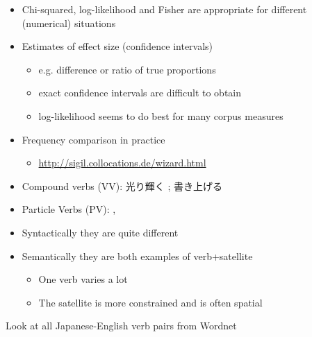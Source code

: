 \documentclass[a4paper,landscape,headrule,footrule,xetex]{foils}
\begin{document}
\begin{itemize}
\item Chi-squared, log-likelihood and Fisher are
appropriate for different (numerical) situations

\item Estimates of effect size (confidence intervals)
\begin{itemize}
\item e.g. difference or ratio of true proportions
\item exact confidence intervals are difficult to obtain
\item log-likelihood seems to do best for many corpus measures
\end{itemize}
\item Frequency comparison in practice
\begin{itemize}
\item \url{http://sigil.collocations.de/wizard.html}
\end{itemize}
\end{itemize}

\begin{itemize}
\item Compound verbs (VV): 光り輝く ; 
  書き上げる 
\item Particle Verbs (PV): , 
\item Syntactically they are quite different
\item Semantically they are both examples of verb+satellite
  \begin{itemize}
  \item One verb varies a lot
  \item The satellite is more constrained and is often spatial
  \end{itemize}
\end{itemize}

Look at all Japanese-English verb pairs from Wordnet
\end{document}
